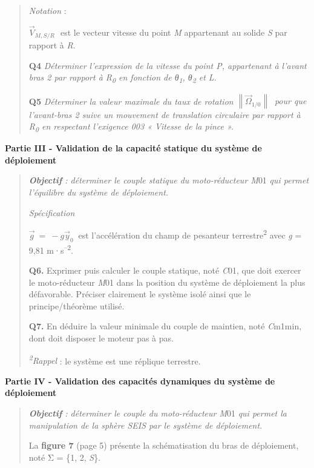 \documentclass[]{article}
\begin{document}
\begin{quote}
\emph{Notation} :

\({\overrightarrow{V}}_{M,S/R}\text{\ \ }\)est le vecteur vitesse du
point \emph{M} appartenant au solide \emph{S} par rapport à \emph{R}.

\textbf{Q4} \emph{Déterminer l'expression de la vitesse du point P,
appartenant à l'avant bras 2 par rapport à R\textsubscript{0} en
fonction de θ\textsubscript{1}, θ\textsubscript{2} et L.}

\textbf{Q5} \emph{Déterminer la valeur maximale du taux de rotation}
\(\left\| {\overrightarrow{\Omega}}_{1/0} \right\|\ \) \emph{pour que
l'avant-bras 2 suive un mouvement de translation circulaire par rapport
à R\textsubscript{0} en respectant l'exigence 003 « Vitesse de la pince
».}
\end{quote}

\protect\hypertarget{page7}{}{}\textbf{Partie III - Validation de la
capacité statique du système de déploiement}

\begin{quote}
\emph{\textbf{Objectif} : déterminer le couple statique du
moto-réducteur M}01 \emph{qui permet l'équilibre du système de
déploiement.}

\emph{Spécification}

\(\overrightarrow{g}\  = \  - g{\overrightarrow{y}}_{0}\ \) est
l'accélération du champ de pesanteur terrestre\textsuperscript{2} avec
\emph{g} = 9,81 m·s\textsuperscript{--2}.

\textbf{Q6.} Exprimer puis calculer le couple statique, noté \emph{C}01,
que doit exercer le moto-réducteur \emph{M}01 dans la position du
système de déploiement la plus défavorable. Préciser clairement le
système isolé ainsi que le principe/théorème utilisé.

\textbf{Q7.} En déduire la valeur minimale du couple de maintien, noté
\emph{C}m1min, dont doit disposer le moteur pas à pas.

\emph{\textsuperscript{2}Rappel} : le système est une réplique
terrestre.
\end{quote}

\textbf{Partie IV - Validation des capacités dynamiques du système de
déploiement}

\begin{quote}
\emph{\textbf{Objectif} : déterminer le couple du moto-réducteur M}01
\emph{qui permet la manipulation de la sphère SEIS par le système de
déploiement.}

La \textbf{figure 7} (page 5) présente la schématisation du bras de
déploiement, noté Σ = \{1, 2, \emph{S}\}.
\end{quote}
\end{document}
